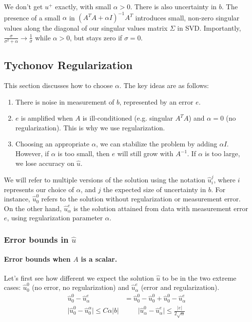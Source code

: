 \documentclass[]{article}
\newcommand{\norm}[1]{\lvert #1 \rvert}
\begin{document}
We don't get $u^{+}$ exactly, with small $\alpha > 0$. There is also uncertainty in $b$. The presence of a small $\alpha$ in $(A^{T}A + \alpha I)^{-1}A^{T}$ introduces small, non-zero singular values along the diagonal of our singular values matrix $\Sigma$ in SVD. Importantly, $\frac{\sigma}{\sigma^{2} + \alpha} \rightarrow \frac{1}{\sigma}$ while $\alpha > 0$, but stays zero if $\sigma = 0$. 

\subsection{Tychonov Regularization}
This section discusses how to choose $\alpha$. The key ideas are as follows:
\begin{enumerate}
	\item There is noise in measurement of $b$, represented by an error $e$. 
	\item $e$ is amplified when $A$ is ill-conditioned (e.g. singular $A^{T}A$) and $\alpha = 0$ (no regularization). This is why we use regularization. 
	\item Choosing an appropriate $\alpha$, we can stabilize the problem by adding $\alpha I$. However, if $\alpha$ is too small, then $e$ will still grow with $A^{-1}$. If $\alpha$ is too large, we lose accuracy on $\hat{u}$. 
\end{enumerate}

We will refer to multiple versions of the solution using the notation $\hat{u}_{i}^{j}$, where $i$ represents our choice of $\alpha$, and $j$ the expected size of uncertainty in $b$. For instance, $\hat{u}_{0}^{0}$ refers to the solution without regularization or measurement error. On the other hand, $\hat{u}_{\alpha}^{e}$ is the solution attained from data with measurement error $e$, using regularization parameter $\alpha$. 

\subsubsection{Error bounds in $\hat{u}$}
\paragraph{Error bounds when $A$ is a scalar. \\ }
Let's first see how different we expect the solution $\hat{u}$ to be in the two extreme cases: $\hat{u}_{0}^{0}$ (no error, no regularization) and $\hat{u}_{\alpha}^{e}$ (error and regularization).
\begin{align}
\hat{u}_{0}^{0} - \hat{u}_{\alpha}^{e} &= \hat{u}_{0}^{0} - \hat{u}_{0}^{0} + \hat{u}_{0}^{0} - \hat{u}_{\alpha}^{e} \\
\norm{\hat{u}_{0}^{0} - \hat{u}_{0}^{\alpha}} \leq C\alpha\norm{b} &\qquad \norm{\hat{u}_{\alpha}^{0} - \hat{u}_{\alpha}^{e}} \leq \frac{\norm{e}}{2\sqrt{\alpha}} \label{errorbounds}
\end{align}
\end{document}
